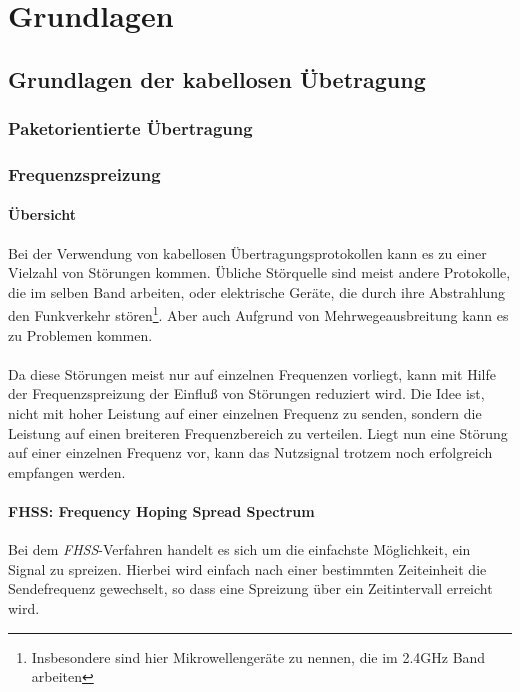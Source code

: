 
\chapter{Grundlagen}\label{Grundlagen}

\section{Grundlagen der kabellosen Übetragung}
    \subsection{Paketorientierte Übertragung}
    \subsection{Frequenzspreizung}
        \subsubsection{Übersicht}
            Bei der Verwendung von kabellosen Übertragungsprotokollen kann es zu einer Vielzahl von 
            Störungen kommen. Übliche Störquelle sind meist andere Protokolle, die im selben Band arbeiten,
            oder elektrische Geräte, die durch ihre Abstrahlung den Funkverkehr stören\footnote{Insbesondere
            sind hier Mikrowellengeräte zu nennen, die im 2.4GHz Band arbeiten}. Aber auch Aufgrund von 
            Mehrwegeausbreitung kann es zu Problemen kommen.\\
            \\
            Da diese Störungen meist nur auf einzelnen Frequenzen vorliegt, kann mit Hilfe der 
            Frequenzspreizung der Einfluß von Störungen reduziert wird. Die Idee ist, nicht mit
            hoher Leistung auf einer einzelnen Frequenz zu senden, sondern die Leistung auf einen
            breiteren Frequenzbereich zu verteilen. Liegt nun eine Störung auf einer einzelnen
            Frequenz vor, kann das Nutzsignal trotzem noch erfolgreich empfangen werden.

        \subsubsection{FHSS: Frequency Hoping Spread Spectrum}\label{FHSS}
            Bei dem \textsl{FHSS}-Verfahren handelt es sich um die einfachste Möglichkeit, ein
            Signal zu spreizen. Hierbei wird einfach nach einer bestimmten Zeiteinheit die
            Sendefrequenz gewechselt, so dass eine Spreizung über ein Zeitintervall erreicht wird.
